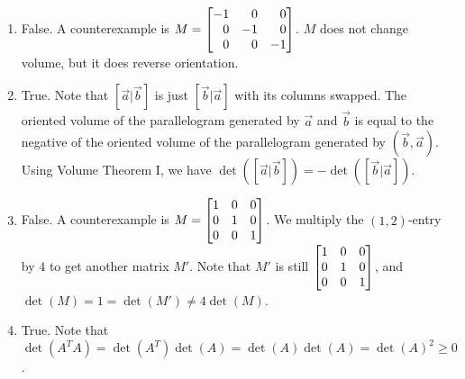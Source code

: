 \begin{exercises}
\begin{problist}
\begin{solution}
\begin{enumerate}
				\item False. A counterexample is
					$M=\mat{-1 & 0 & 0 \\ 0 & -1 & 0 \\ 0 & 0 & -1}$. $M$ does not
					change volume, but it does reverse orientation.

				\item True. Note that $[\vec a|\vec b]$ is just
					$[\vec b|\vec a]$ with its columns swapped. The oriented volume
					of the parallelogram generated by $\vec a$ and $\vec b$ is equal
					to the negative of the oriented volume of the parallelogram generated
					by $(\vec b,\vec a)$. Using Volume Theorem I, we have $\det([\vec
					a|\vec b])=-\det([\vec b|\vec a])$.

				\item False. A counterexample is
					$M=\mat{1 & 0 & 0 \\ 0 & 1 & 0 \\ 0 & 0 & 1}$. We multiply the
					$(1,2)$-entry by $4$ to get another matrix $M'$. Note that
					$M'$ is still $\mat{1 & 0 & 0 \\ 0 & 1 & 0 \\ 0 & 0 & 1 }$, and
					$\det(M)=1=\det(M')\ne 4\det(M)$.

				\item True. Note that
					$\det(A^{T}A)=\det(A^{T})\det(A)=\det(A)\det(A)=\det(A)^{2}\ge
					0$.
			\end{enumerate}
		\end{solution}
	\end{problist}
\end{exercises} 
